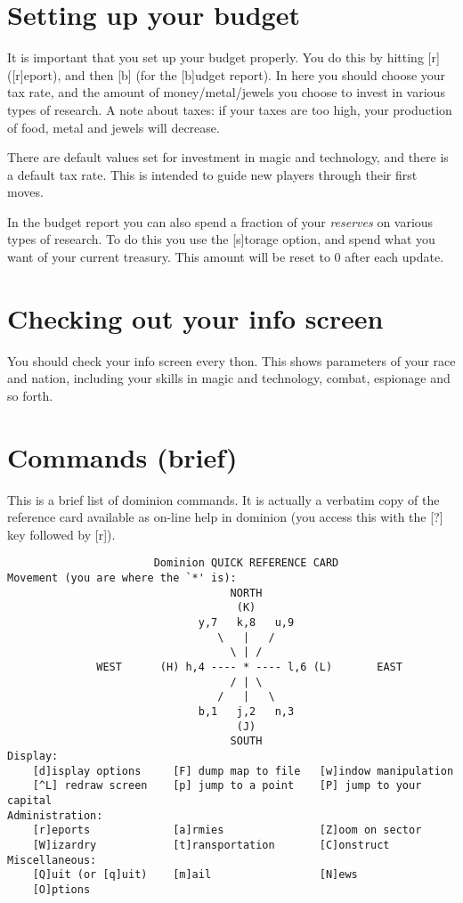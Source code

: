 \section{Setting up your budget}
It is important that you set up your budget properly.  You do
this by hitting [r] ([r]eport), and then [b] (for the [b]udget
report).  In here you should choose your tax rate, and the amount of
money/metal/jewels you choose to invest in various types of research.
A note about taxes: if your taxes are too high, your production of
food, metal and jewels will decrease.

There are default values set for investment in magic and technology,
and there is a default tax rate.  This is intended to guide new
players through their first moves.

In the budget report you can also spend a fraction of your
\emph{reserves} on various types of research.  To do this
you use the [s]torage option, and spend what you want of your current
treasury.  This amount will be reset to 0 after each update.

\section{Checking out your info screen}
You should check your info screen every thon.  This shows parameters
of your race and nation, including your skills in magic and
technology, combat, espionage and so forth.

\section{Commands (brief)}
This is a brief list of dominion commands.  It is actually a verbatim copy
of the reference card available as on-line help in dominion (you access
this with the [?] key followed by [r]).
\newpage
\begin{verbatim}
                       Dominion QUICK REFERENCE CARD
Movement (you are where the `*' is):
                                   NORTH
                                    (K)
                              y,7   k,8   u,9
                                 \   |   /
                                   \ | /
              WEST      (H) h,4 ---- * ---- l,6 (L)       EAST
                                   / | \
                                 /   |   \
                              b,1   j,2   n,3
                                    (J)
                                   SOUTH
Display:
    [d]isplay options     [F] dump map to file   [w]indow manipulation
    [^L] redraw screen    [p] jump to a point    [P] jump to your capital
Administration:
    [r]eports             [a]rmies               [Z]oom on sector
    [W]izardry            [t]ransportation       [C]onstruct
Miscellaneous:
    [Q]uit (or [q]uit)    [m]ail                 [N]ews
    [O]ptions

\end{verbatim}

